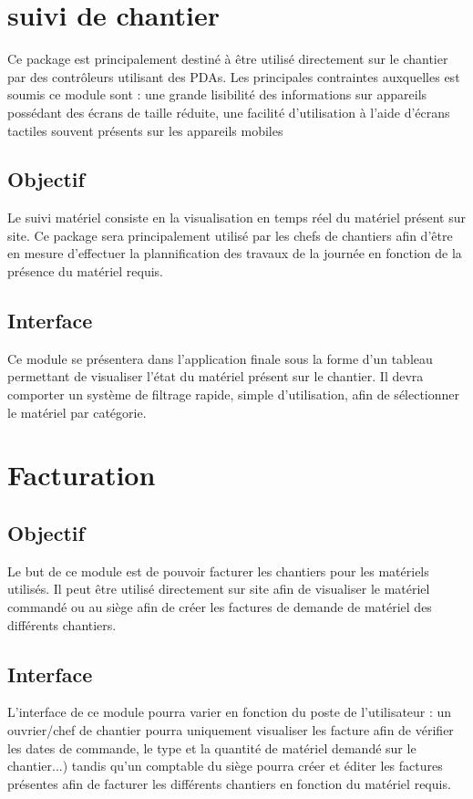 
\section {suivi de chantier}

Ce package est principalement destiné à être utilisé directement sur le chantier par des contrôleurs utilisant des PDAs. Les principales contraintes auxquelles est soumis ce module sont : une grande lisibilité des informations sur appareils possédant des écrans de taille réduite, une facilité d'utilisation à l'aide d'écrans tactiles souvent présents sur les appareils mobiles

	\subsection {Objectif}
	Le suivi matériel consiste en la visualisation en temps réel du matériel présent sur site. Ce package sera principalement utilisé par les chefs de chantiers 		afin d'être en mesure d'effectuer la plannification des travaux de la journée en fonction de la présence du matériel requis.

	\subsection {Interface}
	Ce module se présentera dans l'application finale sous la forme d'un tableau permettant de visualiser l'état du matériel présent sur le chantier. Il devra comporter un système de filtrage rapide, simple d'utilisation, afin de sélectionner le matériel par catégorie.



\section {Facturation}


	\subsection {Objectif}
	Le but de ce module est de pouvoir facturer les chantiers pour les matériels utilisés. Il peut être utilisé directement sur site afin de visualiser le matériel commandé ou au siège afin de créer les factures de demande de matériel des différents chantiers.

	\subsection {Interface}
	L'interface de ce module pourra varier en fonction du poste de l'utilisateur : un ouvrier/chef de chantier pourra uniquement visualiser les facture afin de vérifier les dates de commande, le type et la quantité de matériel demandé sur le chantier...) tandis qu'un comptable du siège pourra créer et éditer les factures présentes afin de facturer les différents chantiers en fonction du matériel requis.
